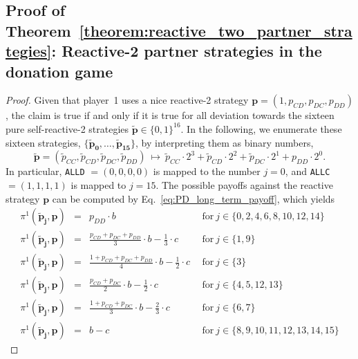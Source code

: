 \documentclass[11pt]{article}
\theoremstyle{plainCl1}
\theoremstyle{plainCl2}
\def\allc{\texttt{ALLC}}
\def\alld{\texttt{ALLD}}
\begin{document}
\subsection{Proof of Theorem~\ref{theorem:reactive_two_partner_strategies}: Reactive-2 partner strategies in the donation game}
\begin{proof}
Given that player~1 uses a nice reactive-2 strategy $\mathbf{p} = (1, p_{CD},p_{DC}, p_{DD})$, the claim is true if and only if it is true for all deviation towards the sixteen pure self-reactive-2 strategies $\mathbf{\tilde{p}}\!\in\!\{0,1\}^{16}$. 
In the following, we enumerate these sixteen strategies, $\{\mathbf{\tilde{p}_0}, \dots, \mathbf{\tilde{p}_{15}}\}$, 
by interpreting them as binary numbers, 
\begin{equation}
\mathbf{\tilde p} = (\tilde p_{CC}, \tilde p_{CD},\tilde p_{DC},\tilde p_{DD}) ~\mapsto~
\tilde p_{CC} \!\cdot\! 2^3 + \tilde p_{CD} \!\cdot\! 2^2 + \tilde p_{DC} \!\cdot\! 2^1 + p_{DD}\cdot 2^0. 
\end{equation}
In particular, \alld{} $=\!(0,0,0,0)$ is mapped to the number $j\!=\!0$, and \allc{} $=\!(1,1,1,1)$ is mapped to $j\!=\!15$. 
The possible payoffs against the reactive strategy $\mathbf{p}$ can be computed by Eq.~\eqref{eq:PD_long_term_payoff}, which yields
\begin{equation*}\label{Eq:PayoffExpressionsReactiveTwo}
  \begin{array}{lcll}
   \pi^1(\mathbf{\tilde p_j},\mathbf{p}) &= &\displaystyle p_{DD}\cdot b & ~~\text{for}~ j\! \in\!  \{0, 2, 4, 6, 8, 10, 12, 14\} \\[0.3cm]
   \pi^1(\mathbf{\tilde p_j},\mathbf{p}) &= &\displaystyle  \frac{p_{CD} + p_{DC} + p_{DD}}{3}\cdot b - \frac{1}{3} \cdot c  & ~~\text{for}~ j\! \in\!  \{1, 9\} \\[0.3cm]
   \pi^1(\mathbf{\tilde p_j},\mathbf{p}) &= &\displaystyle  \frac{1+p_{CD} + p_{DC} + p_{DD} }{4}\cdot b - \frac{1}{2} \cdot c  & ~~\text{for}~ j\! \in\!  \{3\} \\[0.3cm]
   \pi^1(\mathbf{\tilde p_j},\mathbf{p}) &= &\displaystyle  \frac{p_{CD} + p_{DC}}{2}\cdot b - \frac{1}{2} \cdot c  & ~~\text{for}~ j\! \in\!  \{4, 5, 12, 13\} \\[0.3cm]
   \pi^1(\mathbf{\tilde p_j},\mathbf{p}) &= &\displaystyle  \frac{1+p_{CD} + p_{DC}}{3}\cdot b - \frac{2}{3} \cdot c  & ~~\text{for}~ j\! \in\!  \{6, 7\}\\[0.3cm]
   \pi^1(\mathbf{\tilde p_j},\mathbf{p}) &= &\displaystyle  b - c & ~~\text{for}~ j\! \in\!  \{8, 9, 10, 11, 12, 13, 14, 15\}

\end{array}
\end{equation*}
\end{proof}
\end{document}
